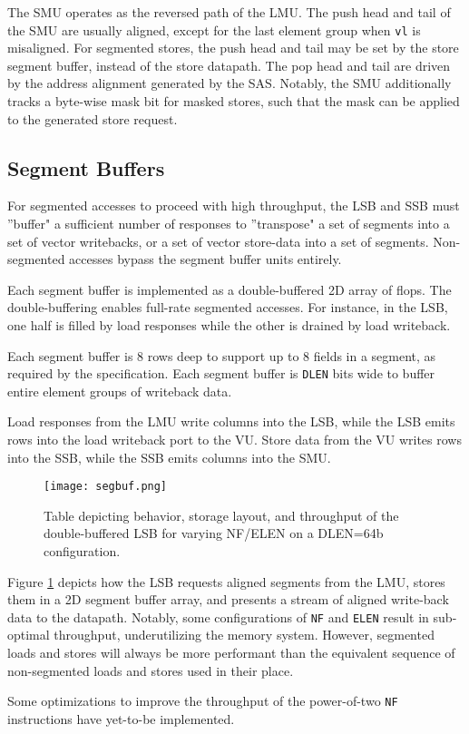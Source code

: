 The SMU operates as the reversed path of the LMU.
The push head and tail of the SMU are usually aligned, except for the last element group when \texttt{vl} is misaligned.
For segmented stores, the push head and tail may be set by the store segment buffer, instead of the store datapath.
The pop head and tail are driven by the address alignment generated by the SAS.
Notably, the SMU additionally tracks a byte-wise mask bit for masked stores, such that the mask can be applied to the generated store request.

\subsection{Segment Buffers}

For segmented accesses to proceed with high throughput, the LSB and SSB must ''buffer" a sufficient number of responses to ''transpose" a set of segments into a set of vector writebacks, or a set of vector store-data into a set of segments.
Non-segmented accesses bypass the segment buffer units entirely.

Each segment buffer is implemented as a double-buffered 2D array of flops.
The double-buffering enables full-rate segmented accesses.
For instance, in the LSB, one half is filled by load responses while the other is drained by load writeback.

Each segment buffer is 8 rows deep to support up to 8 fields in a segment, as required by the specification.
Each segment buffer is \texttt{DLEN} bits wide to buffer entire element groups of writeback data.

Load responses from the LMU write columns into the LSB, while the LSB emits rows into the load writeback port to the VU.
Store data from the VU writes rows into the SSB, while the SSB emits columns into the SMU.

\begin{figure}[hbtp]
  \centering
  \texttt{[image: segbuf.png]}
  \caption{Table depicting behavior, storage layout, and throughput of the double-buffered LSB for varying NF/ELEN on a DLEN=64b configuration.}
  \label{fig:segbuf}
\end{figure}

Figure \ref{fig:segbuf} depicts how the LSB requests aligned segments from the LMU, stores them in a 2D segment buffer array, and presents a stream of aligned write-back data to the datapath.
Notably, some configurations of \texttt{NF} and \texttt{ELEN} result in sub-optimal throughput, underutilizing the memory system.
However, segmented loads and stores will always be more performant than the equivalent sequence of non-segmented loads and stores used in their place.

Some optimizations to improve the throughput of the power-of-two \texttt{NF} instructions have yet-to-be implemented.
